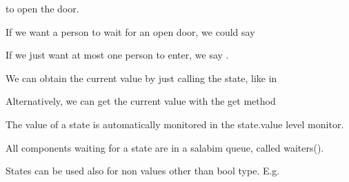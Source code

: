 \documentclass[letterpaper,10pt,english]{sphinxmanual}
\begin{document}
to open the door.

If we want a person to wait for an open door, we could say

\begin{sphinxVerbatim}[commandchars=\\\{\}]
 
\end{sphinxVerbatim}

If we just want at most one person to enter, we say .

We can obtain the current value by just calling the state, like in

\begin{sphinxVerbatim}[commandchars=\\\{\}]
    
\end{sphinxVerbatim}

Alternatively, we can get the current value with the get method

\begin{sphinxVerbatim}[commandchars=\\\{\}]
    
\end{sphinxVerbatim}

The value of a state is automatically monitored in the state.value level monitor.

All components waiting for a state are in a salabim queue, called waiters().

States can be used also for non values other than bool type. E.g.

\begin{sphinxVerbatim}[commandchars=\\\{\}]
 
\end{sphinxVerbatim}
\end{document}
